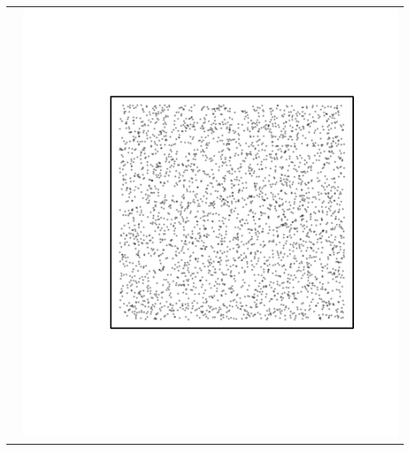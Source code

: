 \documentclass{article}\usepackage{graphicx, color}
\makeatletter
\def\maxwidth{ %
  \ifdim\Gin@nat@width>\linewidth
    \linewidth
  \else
    \Gin@nat@width
  \fi
}
\newenvironment{knitrout}{}{} %
\makeatother
\begin{document}
\begin{tabular}{cc}
&
\begin{knitrout}
\definecolor{shadecolor}{rgb}{0.969, 0.969, 0.969}\color{fgcolor}\includegraphics[width=\maxwidth]{figure/unnamed-chunk-32} 
\end{knitrout}

\\
\end{tabular}

\newpage
\end{document}
